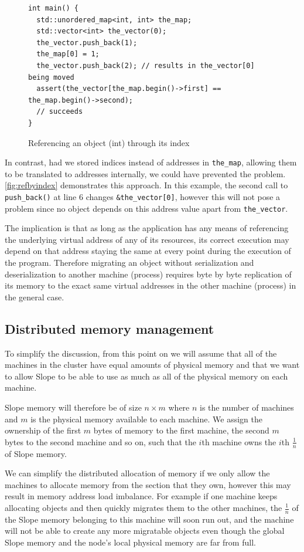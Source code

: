 \begin{figure}[tp]
\begin{lstlisting}
int main() {
  std::unordered_map<int, int> the_map;
  std::vector<int> the_vector(0);
  the_vector.push_back(1);
  the_map[0] = 1;
  the_vector.push_back(2); // results in the_vector[0] being moved
  assert(the_vector[the_map.begin()->first] == the_map.begin()->second);
  // succeeds
}
\end{lstlisting}
\caption{
    Referencing an object (int) through its index
}
\label{fig:refbyindex}
\end{figure}


In contrast, had we stored indices instead of addresses in \texttt{the\_map},
allowing them to be translated to addresses internally, we could have prevented
the problem. \autoref{fig:refbyindex} demonstrates this approach. In this example,
the second call to \texttt{push\_back()} at line $6$ changes \texttt{\&the\_vector[0]},
however this will not pose a problem since no object depends on this address
value apart from \texttt{the\_vector}.

The implication is that as long as the
application has any means of referencing the underlying virtual address of any
of its resources, its correct execution may depend on that address
staying the same at every point during the execution of the program. Therefore
migrating an object without serialization and deserialization to another
machine (process)
requires byte by byte replication of its memory to the exact same virtual
addresses in the other machine (process) in the general case.

\subsection{Distributed memory management}
\label{sec:globalmem}
To simplify the discussion, from this point on we will assume that all of the
machines in the cluster have equal amounts of physical memory and that we want
to allow Slope to be able to use as much as all of the physical memory on each
machine.

Slope memory will therefore be of size $n \times m$ where $n$ is the number
of machines and $m$ is the physical memory available to each machine. We assign
the ownership of the first $m$ bytes of memory to the first machine, the
second $m$ bytes to the second machine and so on, such that the $i$th machine
owns the $i$th $\frac{1}{n}$ of Slope memory.

We can simplify the distributed allocation of memory if we only allow the
machines to allocate memory from the section that they own, however this may
result in memory address load imbalance. For example if one machine keeps
allocating objects and then quickly migrates them to the other machines, the
$\frac{1}{n}$ of the Slope memory belonging to this machine will soon run out,
and the machine will not be able to create any more migratable objects
even though the global Slope memory and the node's local physical memory are
far from full.

